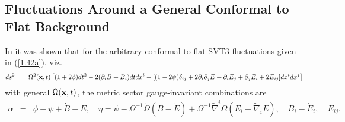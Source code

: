 \documentclass[aps,onecolumn,10pt]{revtex4}
\numberwithin{equation}{section}
\numberwithin{equation}{section}
\begin{document}
\subsection{Fluctuations Around a General Conformal to Flat Background}
\label{S14b}

In \cite{Amarasinghe2018} it was shown that for the arbitrary conformal to flat SVT3 fluctuations given in (\ref{1.42a}), viz.
%
\begin{eqnarray}
ds^2 &=&\Omega^2({\bf x},t)\left[(1+2\phi) dt^2 -2(\partial_i B +B_i)dt dx^i - [(1-2\psi)\delta_{ij} +2\partial_i\partial_j E + \partial_i E_j + \partial_j E_i + 2E_{ij}]dx^i dx^j\right]
\label{14.5}
\end{eqnarray}
%
with general $\Omega({\bf x},t)$, the metric sector gauge-invariant combinations are
%
\begin{eqnarray}
\alpha &=& \phi +\psi+\dot B - \ddot E, \quad \eta=\psi -\Omega^{-1}\dot{\Omega}(B-\dot E)+\Omega^{-1}\tilde\nabla^i\Omega(E_i+\tilde\nabla_i E),\quad B_i-\dot E_i,\quad E_{ij}.
\label{14.6}
\end{eqnarray}
%
\end{document}
